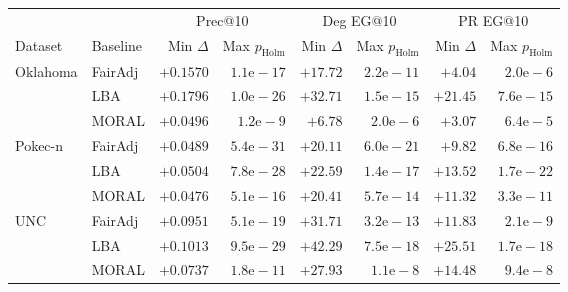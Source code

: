 \begin{tabular}{llrrrrrr}
\toprule
 & & \multicolumn{2}{c}{Prec@10} & \multicolumn{2}{c}{Deg EG@10} & \multicolumn{2}{c}{PR EG@10} \\
\cmidrule(lr){3-4}\cmidrule(lr){5-6}\cmidrule(lr){7-8}
Dataset & Baseline & Min $\Delta$ & Max $p_{\mathrm{Holm}}$ & Min $\Delta$ & Max $p_{\mathrm{Holm}}$ & Min $\Delta$ & Max $p_{\mathrm{Holm}}$ \\
\midrule
Oklahoma & FairAdj & $+0.1570$ & $1.1\mathrm{e}{-}17$ & $+17.72$ & $2.2\mathrm{e}{-}11$ & $+4.04$ & $2.0\mathrm{e}{-}6$ \\
 & LBA & $+0.1796$ & $1.0\mathrm{e}{-}26$ & $+32.71$ & $1.5\mathrm{e}{-}15$ & $+21.45$ & $7.6\mathrm{e}{-}15$ \\
 & MORAL & $+0.0496$ & $1.2\mathrm{e}{-}9$ & $+6.78$ & $2.0\mathrm{e}{-}6$ & $+3.07$ & $6.4\mathrm{e}{-}5$ \\
\addlinespace[2pt]
Pokec-n & FairAdj & $+0.0489$ & $5.4\mathrm{e}{-}31$ & $+20.11$ & $6.0\mathrm{e}{-}21$ & $+9.82$ & $6.8\mathrm{e}{-}16$ \\
 & LBA & $+0.0504$ & $7.8\mathrm{e}{-}28$ & $+22.59$ & $1.4\mathrm{e}{-}17$ & $+13.52$ & $1.7\mathrm{e}{-}22$ \\
 & MORAL & $+0.0476$ & $5.1\mathrm{e}{-}16$ & $+20.41$ & $5.7\mathrm{e}{-}14$ & $+11.32$ & $3.3\mathrm{e}{-}11$ \\
\addlinespace[2pt]
UNC & FairAdj & $+0.0951$ & $5.1\mathrm{e}{-}19$ & $+31.71$ & $3.2\mathrm{e}{-}13$ & $+11.83$ & $2.1\mathrm{e}{-}9$ \\
 & LBA & $+0.1013$ & $9.5\mathrm{e}{-}29$ & $+42.29$ & $7.5\mathrm{e}{-}18$ & $+25.51$ & $1.7\mathrm{e}{-}18$ \\
 & MORAL & $+0.0737$ & $1.8\mathrm{e}{-}11$ & $+27.93$ & $1.1\mathrm{e}{-}8$ & $+14.48$ & $9.4\mathrm{e}{-}8$ \\
\bottomrule
\end{tabular}
